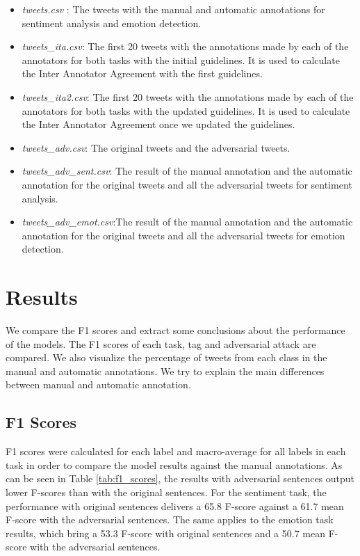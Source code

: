 \documentclass[11pt,a4paper]{article}
\begin{document}
\begin{itemize}
    \item \textit{tweets.csv }: The tweets with the manual and automatic annotations for sentiment analysis and emotion detection.
    \item \textit{tweets\_ita.csv}: The first 20 tweets with the annotations made by each of the annotators for both tasks with the initial guidelines. It is used to calculate the Inter Annotator Agreement with the first guidelines.
    \item \textit{tweets\_ita2.csv}:  The first 20 tweets with the annotations made by each of the annotators for both tasks with the updated guidelines. It is used to calculate the Inter Annotator Agreement once we updated the guidelines.
    \item \textit{tweets\_adv.csv}: The original tweets and the adversarial tweets.
    \item \textit{tweets\_adv\_sent.csv}: The result of the manual annotation and the automatic annotation for the original tweets and all the adversarial tweets for sentiment analysis.
    \item \textit{tweets\_adv\_emot.csv}:The result of the manual annotation and the automatic annotation for the original tweets and all the adversarial tweets for emotion detection.
\end{itemize}

\section{Results}

We compare the F1 scores and extract some conclusions about the performance of the models. The F1 scores of each task, tag and adversarial attack are compared. We also visualize the percentage of tweets from each class in the manual and automatic annotations. We try to explain the main differences between manual and automatic annotation.

\subsection{F1 Scores}

F1 scores were calculated for each label and macro-average for all labels in each task in order to compare the model results against the manual annotations. As can be seen in Table \ref{tab:f1_scores}, the results with adversarial sentences output lower F-scores than with the original sentences. For the sentiment task, the performance with original sentences delivers a 65.8 F-score against a 61.7 mean F-score with the adversarial sentences. The same applies to the emotion task results, which bring a 53.3 F-score with original sentences and a 50.7 mean F-score with the adversarial sentences.
\end{document}
